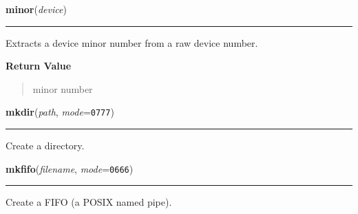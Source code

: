     \label{os:minor}

    \vspace{0.5ex}

\hspace{.8\funcindent}\begin{boxedminipage}{\funcwidth}

    \raggedright \textbf{minor}(\textit{device})

    \vspace{-1.5ex}

    \rule{\textwidth}{0.5\fboxrule}
\setlength{\parskip}{2ex}
    Extracts a device minor number from a raw device number.

\setlength{\parskip}{1ex}
      \textbf{Return Value}
    \vspace{-1ex}

      \begin{quote}
      minor number

      \end{quote}

    \end{boxedminipage}

    \label{os:mkdir}

    \vspace{0.5ex}

\hspace{.8\funcindent}\begin{boxedminipage}{\funcwidth}

    \raggedright \textbf{mkdir}(\textit{path}, \textit{mode}={\tt 0777})

    \vspace{-1.5ex}

    \rule{\textwidth}{0.5\fboxrule}
\setlength{\parskip}{2ex}
    Create a directory.

\setlength{\parskip}{1ex}
    \end{boxedminipage}

    \label{os:mkfifo}

    \vspace{0.5ex}

\hspace{.8\funcindent}\begin{boxedminipage}{\funcwidth}

    \raggedright \textbf{mkfifo}(\textit{filename}, \textit{mode}={\tt 0666})

    \vspace{-1.5ex}

    \rule{\textwidth}{0.5\fboxrule}
\setlength{\parskip}{2ex}
    Create a FIFO (a POSIX named pipe).

\setlength{\parskip}{1ex}
    \end{boxedminipage}

